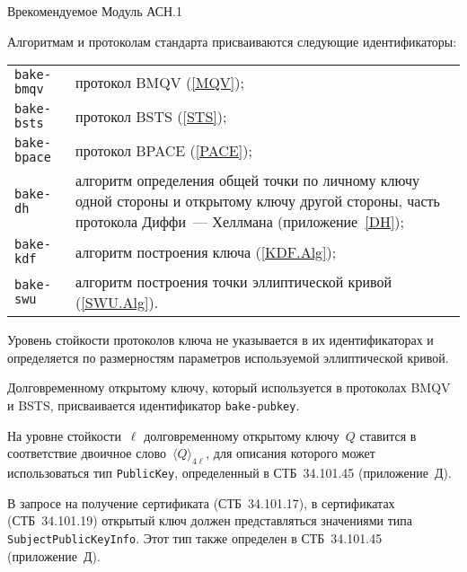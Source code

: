 \begin{appendix}{В}{рекомендуемое}
{Модуль АСН.1}
\label{ASN}

\label{ASN.OIDs}

Алгоритмам и протоколам стандарта присваиваются 
следующие идентификаторы:
\begin{center}
\begin{tabular}{p{4cm}p{12cm}}
\texttt{bake-bmqv} &
протокол BMQV (\ref{MQV});\\
%
\texttt{bake-bsts} &
протокол BSTS (\ref{STS});\\
%
\texttt{bake-bpace} &
протокол BPACE (\ref{PACE});\\
%
\texttt{bake-dh} &
алгоритм определения общей точки по личному ключу 
одной стороны и открытому ключу другой стороны,
часть протокола Диффи~--- Хеллмана (приложение~\ref{DH});\\
%
\texttt{bake-kdf} &
алгоритм построения ключа (\ref{KDF.Alg});\\
%
\texttt{bake-swu} &
алгоритм построения точки эллиптической кривой (\ref{SWU.Alg}).\\
\end{tabular}
\end{center}

Уровень стойкости протоколов ключа не указывается 
в их идентификаторах и определяется по размерностям параметров 
используемой эллиптической кривой. 

Долговременному открытому ключу, 
который используется в протоколах BMQV и BSTS, 
присваивается идентификатор \texttt{bake-pubkey}.

\label{ASN.PubKey}

На уровне стойкости~$\ell$ долговременному открытому ключу~$Q$ 
ставится в соответствие двоичное слово~$\langle Q\rangle_{4\ell}$,
для описания которого может использоваться тип \texttt{PublicKey},
определенный в СТБ~34.101.45 (приложение~Д).

В запросе на получение сертификата (СТБ~34.101.17),
в сертификатах (СТБ~34.101.19)
открытый ключ должен представляться значениями типа
\texttt{SubjectPublicKeyInfo}. 
Этот тип также определен в СТБ~34.101.45
(приложение~Д).

\label{ASN.Module}




\end{appendix}